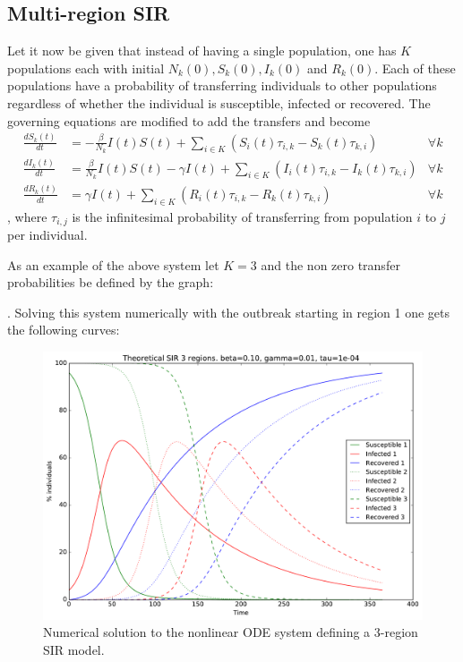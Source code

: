 \subsection{Multi-region SIR}
Let it now be given that instead of having a single population, one has $K$ populations each with initial $N_k(0), S_k(0), I_k(0)$ and $R_k(0)$. Each of these populations have a probability of transferring individuals to other populations regardless of whether the individual is susceptible, infected or recovered. The governing equations are modified to add the transfers and become
\begin{align}
\frac{d S_k(t)}{dt} &= - \frac{\beta}{N_k} I(t) S(t) + \sum_{i\in K} \left( S_i(t)\tau_{i,k} - S_k(t)\tau_{k, i}\right)   &\forall k\\
\frac{d I_k(t)}{dt} &= \frac{\beta}{N_k} I(t) S(t) - \gamma I(t) + \sum_{i\in K} \left( I_i(t)\tau_{i,k} - I_k(t)\tau_{k, i}\right)  &\forall k\\
\frac{d R_k(t)}{dt} &= \gamma I(t) + \sum_{i\in K} \left( R_i(t)\tau_{i,k} - R_k(t)\tau_{k, i}\right) &\forall k
\end{align}
, where $\tau_{i,j}$ is the infinitesimal probability of transferring from population $i$ to $j$ per individual.

As an example of the above system let $K=3$ and the non zero transfer probabilities be defined by the graph:
\begin{figure}[H]
	\centering
{}
\end{figure}
. Solving this system numerically with the outbreak starting in region 1 one gets the following curves:
\begin{figure}[H]
	\centering
	\includegraphics[width= 1.0 \linewidth]{plots/sir_three_region_theory.pdf}
	\caption{Numerical solution to the nonlinear ODE system defining a 3-region SIR model.}
\end{figure}

